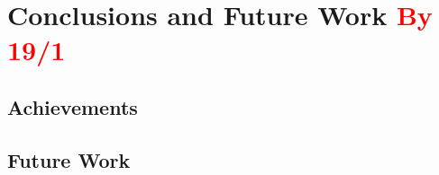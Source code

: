 \chapter{Conclusions and Future Work \textcolor{red}{By 19/1}}
\label{chapter:conclusions}

\section{Achievements}
\label{sec:chp7-1_achievements}


\section{Future Work}
\label{sec:chp7-2_future_work}